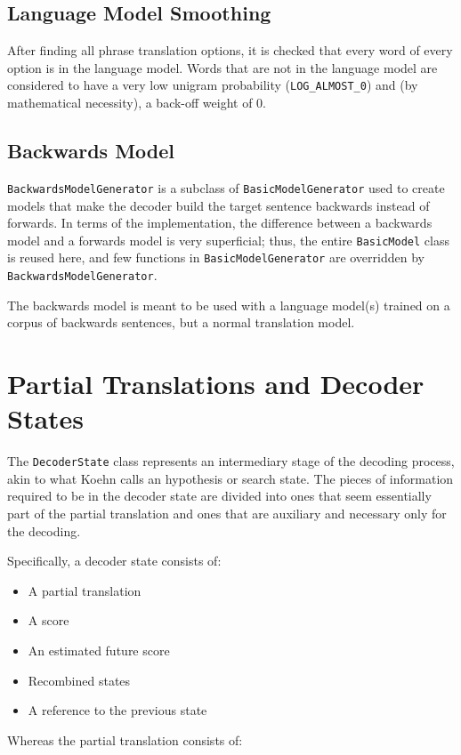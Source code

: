 \documentclass[12pt]{amsart} \usepackage{epsfig} \usepackage{rotating}
\newcommand{\code}{\small\texttt}
\begin{document}
\subsection{Language Model Smoothing}
After finding all phrase translation options, it is checked that every word of
every option is in the language model.  Words that are not in the language
model are considered to have a very low unigram probability
(\code{LOG\_ALMOST\_0}) and (by mathematical necessity), a back-off weight of
$0$.

\subsection{Backwards Model}
\code{BackwardsModelGenerator} is a subclass of \code{BasicModelGenerator} used
to create models that make the decoder build the target sentence backwards
instead of forwards.  In terms of the implementation, the difference between a
backwards model and a forwards model is very superficial; thus, the entire
\code{BasicModel} class is reused here, and few functions in
\code{BasicModelGenerator} are overridden by \code{BackwardsModelGenerator}.

The backwards model is meant to be used with a language model(s) trained on a
corpus of backwards sentences, but a normal translation model.


\section{Partial Translations and Decoder States}
The \code{DecoderState} class represents an intermediary stage of the decoding
process, akin to what Koehn calls an hypothesis or search state.  The pieces of
information required to be in the decoder state are divided into ones that seem
essentially part of the partial translation and ones that are auxiliary and
necessary only for the decoding.

Specifically, a decoder state consists of:

\begin{itemize}
\item A partial translation
\item A score
\item An estimated future score
\item Recombined states
\item A reference to the previous state
\end{itemize}

Whereas the partial translation consists of:
\end{document}
